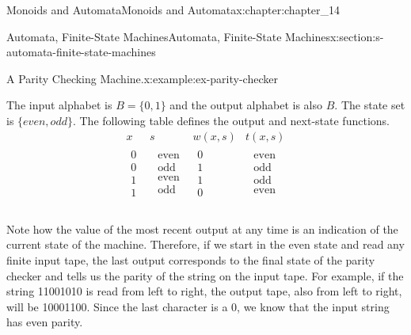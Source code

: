 \documentclass[oneside,10pt,]{book}
\numberwithin{equation}{section}
\begin{document}
\begin{chapterptx}{Monoids and Automata}{}{Monoids and Automata}{}{}{x:chapter:chapter_14}
\begin{sectionptx}{Automata, Finite-State Machines}{}{Automata, Finite-State Machines}{}{}{x:section:s-automata-finite-state-machines}
\begin{example}{A Parity Checking Machine.}{x:example:ex-parity-checker}
\par
The input alphabet is \(B=\{0,1\}\) and the output alphabet is also \(B\). The state set is \(\{even, odd\}\). The following table defines the output and next-state functions.%
\begin{equation*}
\begin{array}{c|ccc}
x & s & w(x,s) & t(x,s) \\
\hline
\begin{array}{c}
0 \\
0 \\
1 \\
1 \\
\end{array}
& 
\begin{array}{c}
\textrm{ even} \\
\textrm{ odd} \\
\textrm{ even} \\
\textrm{ odd} \\
\end{array}
& 
\begin{array}{c}
0 \\
1 \\
1 \\
0 \\
\end{array}
& 
\begin{array}{c}
\textrm{ even} \\
\textrm{ odd} \\
\textrm{ odd} \\
\textrm{ even} \\
\end{array}
\\
\end{array}
\end{equation*}
%
\par
Note how the value of the most recent output at any time is an indication of the current state of the machine. Therefore, if we start in the even state and read any finite input tape, the last output corresponds to the final state of the parity checker and tells us the parity of the string on the input tape. For example, if the string 11001010 is read from left to right, the output tape, also from left to right, will be 10001100. Since the last character is a 0, we know that the input string has even parity.%
\end{example}

\end{sectionptx}
\end{chapterptx}
\end{document}

